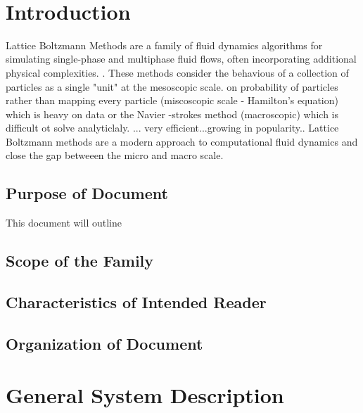 \documentclass[12pt]{article}
\begin{document}

\newpage

\tableofcontents

~\newpage


\section{Introduction}

Lattice Boltzmann Methods are a family of fluid dynamics algorithms for simulating single-phase and multiphase fluid flows, often incorporating additional physical complexities. \citet{chen1998lattice}. These methods consider the behavious of a collection of particles as a single "unit" at the mesoscopic scale. on probability of particles rather than mapping every particle (miscoscopic scale - Hamilton's equation) which is heavy on data or the Navier -strokes method (macroscopic) which is difficult ot solve analyticlaly. ... very efficient...growing in popularity..
Lattice Boltzmann methods are a modern approach to computational fluid dynamics and close the gap betweeen the micro and macro scale. 


\subsection{Purpose of Document}

This document will outline 

\subsection{Scope of the Family} 

\subsection{Characteristics of Intended Reader} 

\subsection{Organization of Document}

\section{General System Description}
\end{document}

